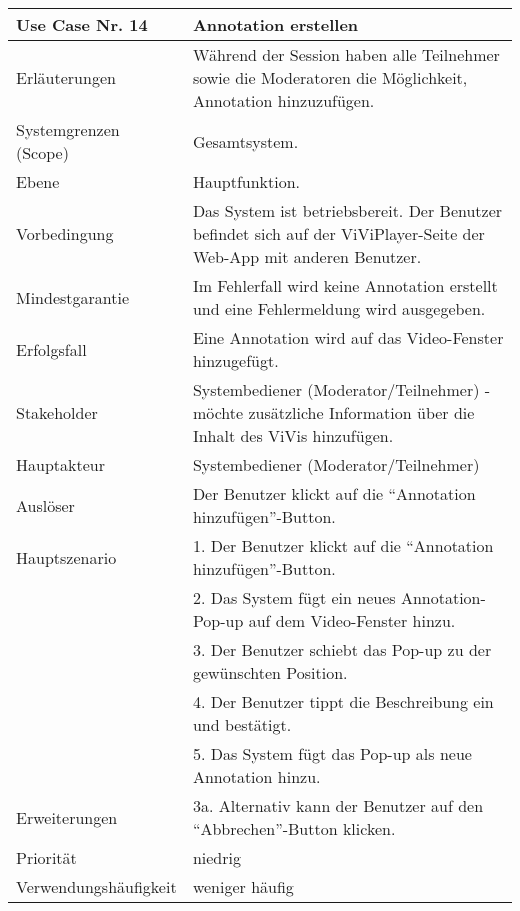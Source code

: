 \begin{tabularx}{\linewidth}{|l|X|}
	\hline
	Use Case Nr. 14			& \textbf{Annotation erstellen} \\ \hline
	Erläuterungen			& Während der Session haben alle Teilnehmer sowie die Moderatoren die 
							  Möglichkeit, Annotation hinzuzufügen. \\ \hline
	Systemgrenzen (Scope)	& Gesamtsystem. \\ \hline
	Ebene					& Hauptfunktion. \\ \hline
	Vorbedingung			& Das System ist betriebsbereit. Der Benutzer befindet sich auf der 
							  ViViPlayer-Seite der Web-App mit anderen Benutzer. \\ \hline
	Mindestgarantie			& Im Fehlerfall wird keine Annotation erstellt und eine Fehlermeldung wird 
							  ausgegeben. \\ \hline
	Erfolgsfall				& Eine Annotation wird auf das Video-Fenster hinzugefügt. \\ \hline
	Stakeholder				& Systembediener (Moderator/Teilnehmer) - möchte zusätzliche Information 
		     				  über die Inhalt des ViVis hinzufügen. \\ \hline
	Hauptakteur				& Systembediener (Moderator/Teilnehmer) \\ \hline
	Auslöser				& Der Benutzer klickt auf die ``Annotation hinzufügen''-Button. \\ \hline	
	Hauptszenario			& 1. Der Benutzer klickt auf die ``Annotation hinzufügen''-Button. \\
							& 2. Das System fügt ein neues Annotation-Pop-up auf dem Video-Fenster 
							  hinzu. \\
							& 3. Der Benutzer schiebt das Pop-up zu der gewünschten Position. \\
							& 4. Der Benutzer tippt die Beschreibung ein und bestätigt. \\
							& 5. Das System fügt das Pop-up als neue Annotation hinzu. \\ \hline
	Erweiterungen			& 3a. Alternativ kann der Benutzer auf den ``Abbrechen''-Button klicken.\\ 
							  \hline
	Priorität				& niedrig \\ \hline
	Verwendungshäufigkeit	& weniger häufig  \\ \hline
\end{tabularx}

